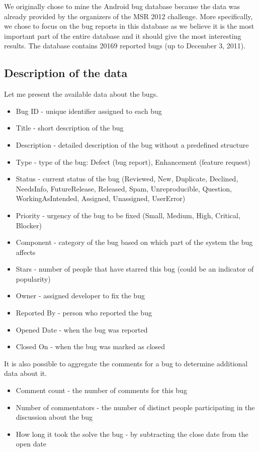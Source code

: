 
We originally chose to mine the Android bug database because the data was already provided by the organizers of the MSR 2012 challenge. More specifically, we chose to focus on the bug reports in this database as we believe it is the most important part of the entire database and it should give the most interesting results. The database contains 20169 reported bugs (up to December 3, 2011). 

\subsection*{Description of the data} %
\label{sub:Description of the data}

Let me present the available data about the bugs.

\begin{itemize}
\item Bug ID - unique identifier assigned to each bug
\item Title - short description of the bug
\item Description - detailed description of the bug without a predefined structure
\item Type - type of the bug: Defect (bug report), Enhancement (feature request)
\item Status - current status of the bug (Reviewed, New, Duplicate, Declined, NeedsInfo, FutureRelease, Released, Spam, Unreproducible, Question, WorkingAsIntended, Assigned, Unassigned, UserError)
\item Priority - urgency of the bug to be fixed (Small, Medium, High, Critical, Blocker)
\item Component - category of the bug based on which part of the system the bug affects
\item Stars - number of people that have starred this bug (could be an indicator of popularity)
\item Owner - assigned developer to fix  the bug
\item Reported By - person who reported the bug
\item Opened Date - when the bug was reported
\item Closed On - when the bug was marked as closed
\end{itemize}

It is also possible to aggregate the comments for a bug to determine additional data about it.

\begin{itemize}
\item Comment count - the number of comments for this bug
\item Number of commentators - the number of distinct people participating in the discussion about the bug
\item How long it took the solve the bug - by subtracting the close date from the open date
\end{itemize}

